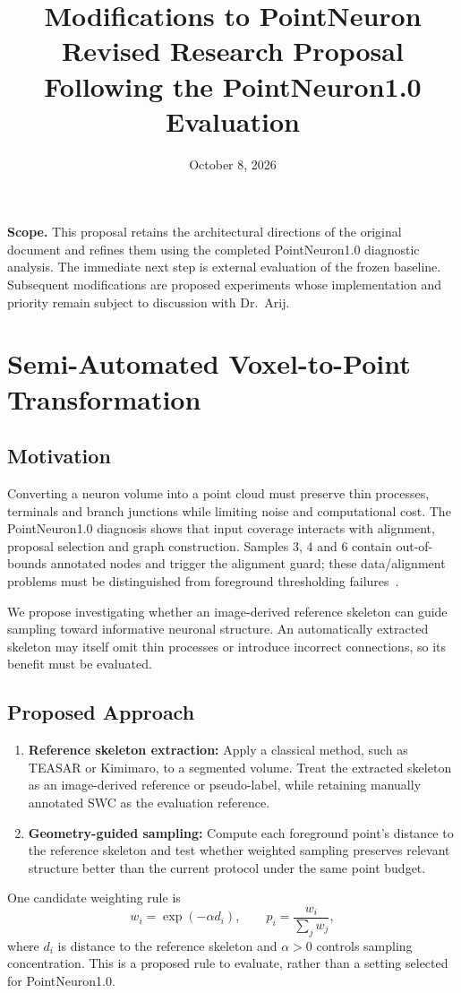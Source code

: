\documentclass[11pt,a4paper]{article}
\title{Modifications to PointNeuron\\[0.4em]
\large Revised Research Proposal Following the PointNeuron1.0 Evaluation}
\author{}
\date{October 8, 2026}
\begin{document}
\maketitle

\noindent\textbf{Scope.}
This proposal retains the architectural directions of the original document and refines them using the completed PointNeuron1.0 diagnostic analysis. The immediate next step is external evaluation of the frozen baseline. Subsequent modifications are proposed experiments whose implementation and priority remain subject to discussion with Dr.~Arij.

\section{Semi-Automated Voxel-to-Point Transformation}

\subsection{Motivation}
Converting a neuron volume into a point cloud must preserve thin processes, terminals and branch junctions while limiting noise and computational cost. The PointNeuron1.0 diagnosis shows that input coverage interacts with alignment, proposal selection and graph construction. Samples 3, 4 and 6 contain out-of-bounds annotated nodes and trigger the alignment guard; these data/alignment problems must be distinguished from foreground thresholding failures~\cite{report,diagnostics}.

We propose investigating whether an image-derived reference skeleton can guide sampling toward informative neuronal structure. An automatically extracted skeleton may itself omit thin processes or introduce incorrect connections, so its benefit must be evaluated.

\subsection{Proposed Approach}
\begin{enumerate}
    \item \textbf{Reference skeleton extraction:} Apply a classical method, such as TEASAR or Kimimaro, to a segmented volume. Treat the extracted skeleton as an image-derived reference or pseudo-label, while retaining manually annotated SWC as the evaluation reference.
    \item \textbf{Geometry-guided sampling:} Compute each foreground point's distance to the reference skeleton and test whether weighted sampling preserves relevant structure better than the current protocol under the same point budget.
\end{enumerate}
One candidate weighting rule is
\begin{equation}
    w_i = \exp(-\alpha d_i), \qquad
    p_i = \frac{w_i}{\sum_j w_j},
\end{equation}
where $d_i$ is distance to the reference skeleton and $\alpha>0$ controls sampling concentration. This is a proposed rule to evaluate, rather than a setting selected for PointNeuron1.0.
\end{document}
